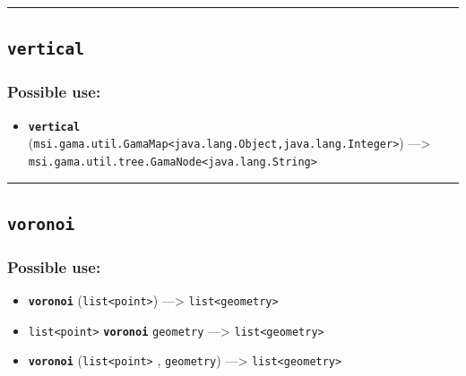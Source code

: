\documentclass[]{book}
\providecommand{\tightlist}{%
  \setlength{\itemsep}{0pt}\setlength{\parskip}{0pt}}
\theoremstyle{definition}
\theoremstyle{definition}
\theoremstyle{definition}
\theoremstyle{remark}
\begin{document}
\begin{center}\rule{0.5\linewidth}{\linethickness}\end{center}

\subsection{\texorpdfstring{\texttt{vertical}}{vertical}}\label{vertical}

\subsubsection{Possible use:}\label{possible-use-551}

\begin{itemize}
\tightlist
\item
  \textbf{\texttt{vertical}}
  (\texttt{msi.gama.util.GamaMap\textless{}java.lang.Object,java.lang.Integer\textgreater{}})
  ---\textgreater{}
  \texttt{msi.gama.util.tree.GamaNode\textless{}java.lang.String\textgreater{}}
\end{itemize}

\begin{center}\rule{0.5\linewidth}{\linethickness}\end{center}

\subsection{\texorpdfstring{\texttt{voronoi}}{voronoi}}\label{voronoi}

\subsubsection{Possible use:}\label{possible-use-552}

\begin{itemize}
\tightlist
\item
  \textbf{\texttt{voronoi}}
  (\texttt{list\textless{}point\textgreater{}}) ---\textgreater{}
  \texttt{list\textless{}geometry\textgreater{}}
\item
  \texttt{list\textless{}point\textgreater{}} \textbf{\texttt{voronoi}}
  \texttt{geometry} ---\textgreater{}
  \texttt{list\textless{}geometry\textgreater{}}
\item
  \textbf{\texttt{voronoi}} (\texttt{list\textless{}point\textgreater{}}
  , \texttt{geometry}) ---\textgreater{}
  \texttt{list\textless{}geometry\textgreater{}}
\end{itemize}
\end{document}
